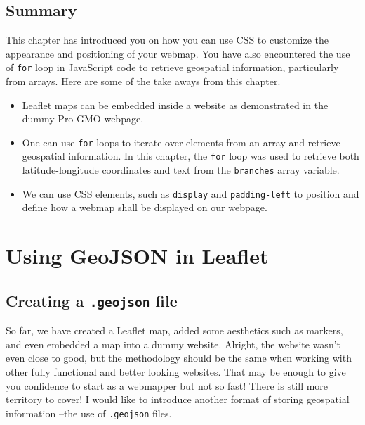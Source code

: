 \documentclass[
]{book}
\begin{document}
\hypertarget{summary-3}{%
\section{Summary}\label{summary-3}}

This chapter has introduced you on how you can use CSS to customize the appearance and positioning of your webmap. You have also encountered the use of \texttt{for} loop in JavaScript code to retrieve geospatial information, particularly from arrays. Here are some of the take aways from this chapter.

\begin{itemize}
\item
  Leaflet maps can be embedded inside a website as demonstrated in the dummy Pro-GMO webpage.
\item
  One can use \texttt{for} loops to iterate over elements from an array and retrieve geospatial information. In this chapter, the \texttt{for} loop was used to retrieve both latitude-longitude coordinates and text from the \texttt{branches} array variable.
\item
  We can use CSS elements, such as \texttt{display} and \texttt{padding-left} to position and define how a webmap shall be displayed on our webpage.
\end{itemize}

\hypertarget{using-geojson-in-leaflet}{%
\chapter{Using GeoJSON in Leaflet}\label{using-geojson-in-leaflet}}

\hypertarget{creating-a-.geojson-file}{%
\section{\texorpdfstring{Creating a \texttt{.geojson} file}{Creating a .geojson file}}\label{creating-a-.geojson-file}}

So far, we have created a Leaflet map, added some aesthetics such as markers, and even embedded a map into a dummy website. Alright, the website wasn't even close to good, but the methodology should be the same when working with other fully functional and better looking websites. That may be enough to give you confidence to start as a webmapper but not so fast! There is still more territory to cover! I would like to introduce another format of storing geospatial information --the use of \texttt{.geojson} files.
\end{document}

